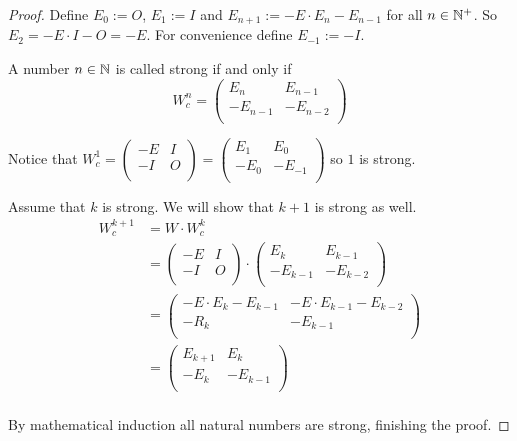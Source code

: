 \begin{proof}
  Define $E_{0} := O$, $E_{1} := I$ and
  $E_{n+1} := -E \cdot E_{n} - E_{n-1}$ for all $n\in\mathbb{N}^{+}$. So
  $E_{2} = -E \cdot I - O = -E$. For convenience define $E_{-1} := -I$. 

  A number $n\in\mathbb{N}$ is called strong if and only if
  \[
  W_{c}^{n}
  =
  \left(
  \begin{array}{cc}
     E_{n} &  E_{n-1}  \\
    -E_{n-1} & -E_{n-2} \\
  \end{array}
  \right)
  \]

  Notice that
  $W_{c}^{1} = \left(\begin{smallmatrix} -E & I \\ -I & O \\\end{smallmatrix}\right) = \left(\begin{smallmatrix} E_{1} & E_{0} \\ -E_{0} & -E_{-1} \\\end{smallmatrix}\right)$
  so $1$ is strong.

  Assume that $k$ is strong. We will show that $k+1$ is strong as well.
  \[
  \begin{aligned}
  W_{c}^{k+1}
  & = W \cdot W_{c}^{k} \\
  & =
  \left(
  \begin{array}{cc}
    -E & I \\
    -I & O \\
  \end{array}
  \right)
  \cdot
  \left(
  \begin{array}{cc}
     E_{k} &  E_{k-1}  \\
    -E_{k-1} & -E_{k-2} \\
  \end{array}
  \right) \\
  & =
  \left(
  \begin{array}{cc}
    -E \cdot E_{k} - E_{k-1} & -E \cdot E_{k-1} - E_{k-2} \\
    -R_{k}                  & -E_{k-1}                 \\
  \end{array}
  \right) \\
  & =
  \left(
  \begin{array}{cc}
     E_{k+1} &  E_{k} \\
    -E_{k} & -E_{k-1} \\
  \end{array}
  \right) \\
  \end{aligned}
  \]

  By mathematical induction all natural
  numbers are strong, finishing the proof.
\end{proof}

